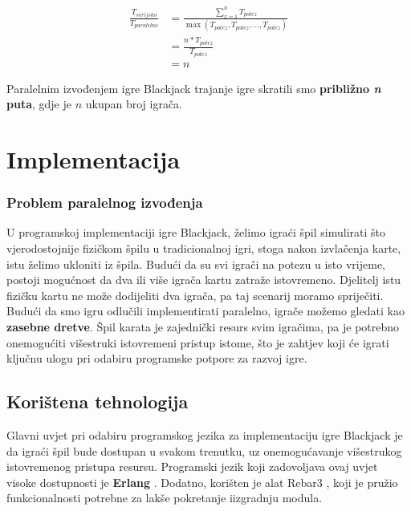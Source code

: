 \documentclass[conference]{IEEEtran}
\begin{document}
\begin{equation}
\begin{split}
\frac{T_{serijsko}}{T_{paralelno}} &= \frac{\sum_{x=1}^{n} T_{potez}}{\max{(T_{potez}, T_{potez}, ... , T_{potez})}} \\
&= \frac{n * T_{potez}}{T_{potez}} \\
&= n
\end{split}
\end{equation}

Paralelnim izvođenjem igre Blackjack trajanje igre skratili smo \textbf{približno \textit{n} puta}, gdje je $n$ ukupan broj igrača.





\section{Implementacija}

\subsubsection{Problem paralelnog izvođenja}

U programskoj implementaciji igre Blackjack, želimo igraći špil simulirati što vjerodostojnije fizičkom špilu u tradicionalnoj igri, stoga nakon izvlačenja karte, istu želimo ukloniti iz špila. Budući da su svi igrači na potezu u isto vrijeme, postoji mogućnost da dva ili više igrača kartu zatraže istovremeno. Djelitelj istu fizičku kartu ne može dodijeliti dva igrača, pa taj scenarij moramo spriječiti. Budući da smo igru odlučili implementirati paralelno, igrače možemo gledati kao \textbf{zasebne dretve}. Špil karata je zajednički resurs svim igračima, pa je potrebno onemogućiti višestruki istovremeni pristup istome, što je zahtjev koji će igrati ključnu ulogu pri odabiru programske potpore za razvoj igre.

\subsection{Korištena tehnologija}

Glavni uvjet pri odabiru programskog jezika za implementaciju igre Blackjack je da igraći špil bude dostupan u svakom trenutku, uz onemogućavanje višestrukog istovremenog pristupa resursu. Programski jezik koji zadovoljava ovaj uvjet visoke dostupnosti je \textbf{Erlang} \cite{erlang}. Dodatno, korišten je alat Rebar3 \cite{rebar3}, koji je pružio funkcionalnosti potrebne za lakše pokretanje i\break izgradnju modula.
\end{document}
